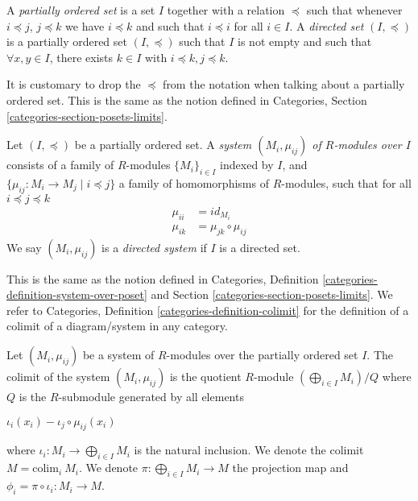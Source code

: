 \begin{definition}
\label{definition-directed-set}
A {\it partially ordered set} is a set $I$ together with a relation
$\preceq$ such that whenever $i \preceq j$, $j \preceq k$
we have $i \preceq k$ and such that $i \preceq i$ for all $i \in I$.
A {\it directed set} $(I, \preceq)$
is a partially ordered set $(I, \preceq)$ such that
$I$ is not empty and such that $\forall x, y\in I$,
there exists $k\in I$ with $i\preceq k, j\preceq k$.
\end{definition}

\noindent
It is customary to drop the $\preceq$ from the notation when talking
about a partially ordered set.
This is the same as the notion defined in Categories,
Section \ref{categories-section-posets-limits}.

\begin{definition}
\label{definition-directed-system}
Let $(I, \preceq)$ be a partially ordered set.
A {\it system $(M_i, \mu_{ij})$ of $R$-modules over $I$}
consists of a family of $R$-modules $\{M_i\}_{i\in I}$ indexed
by $I$, and $\{\mu_{ij} : M_i\rightarrow M_j \mid i\preceq j\}$
a family of homomorphisms of
$R$-modules, such that for all $i \preceq j \preceq k$
\begin{align}
\mu_{ii} &= id_{M_i}\\
\mu_{ik} &= \mu_{jk}\circ \mu_{ij}
\end{align}
We say $(M_i, \mu_{ij})$ is a {\it directed system} if $I$ is a directed set.
\end{definition}

\noindent
This is the same as the notion defined in Categories,
Definition \ref{categories-definition-system-over-poset}
and Section \ref{categories-section-posets-limits}.
We refer to Categories, Definition \ref{categories-definition-colimit}
for the definition of a colimit of a diagram/system in any
category.

\begin{lemma}
\label{lemma-colimit}
Let $(M_i, \mu_{ij})$ be a system of $R$-modules over the
partially ordered set $I$.
The colimit of the system $(M_i, \mu_{ij})$ is the quotient $R$-module
$(\bigoplus_{i\in I} M_i) /Q$ where $Q$ is the
$R$-submodule generated by all elements
\begin{center}
$\iota_{i}(x_i)-\iota_{j}\circ \mu_{ij}(x_i)$
\end{center}
where $\iota_{i} : M_i \rightarrow \bigoplus_{i\in I} M_i$
is the natural inclusion. We denote the colimit
$M = \text{colim}_i\ M_i$. We denote
$\pi : \bigoplus_{i\in I} M_i \rightarrow M$ the
projection map and
$\phi_{i} = \pi \circ \iota_{i} : M_i\rightarrow M$.
\end{lemma}

